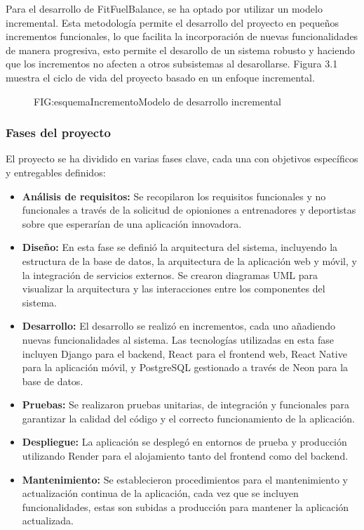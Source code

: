Para el desarrollo de FitFuelBalance, se ha optado por utilizar un modelo incremental. Esta metodología permite el desarrollo del proyecto en pequeños incrementos funcionales, lo que facilita la incorporación de nuevas funcionalidades de manera progresiva, esto permite el desarollo de un sistema robusto y haciendo que los incrementos no afecten a otros subsistemas al desarollarse. Figura 3.1 muestra el ciclo de vida del proyecto basado en un enfoque incremental.

\begin{figure}[Esquema Modelo Incremental]{FIG:esquemaIncremento}{Modelo de desarrollo incremental}
\end{figure}

\subsubsection{Fases del proyecto}

El proyecto se ha dividido en varias fases clave, cada una con objetivos específicos y entregables definidos:

\begin{itemize}
    \item \textbf{Análisis de requisitos:} Se recopilaron los requisitos funcionales y no funcionales a través de la solicitud de opioniones a entrenadores y deportistas sobre que esperarían de una aplicación innovadora.

    \item \textbf{Diseño:} En esta fase se definió la arquitectura del sistema, incluyendo la estructura de la base de datos, la arquitectura de la aplicación web y móvil, y la integración de servicios externos. Se crearon diagramas UML para visualizar la arquitectura y las interacciones entre los componentes del sistema.

    \item \textbf{Desarrollo:} El desarrollo se realizó en incrementos, cada uno añadiendo nuevas funcionalidades al sistema. Las tecnologías utilizadas en esta fase incluyen Django para el backend, React para el frontend web, React Native para la aplicación móvil, y PostgreSQL gestionado a través de Neon para la base de datos.

    \item \textbf{Pruebas:} Se realizaron pruebas unitarias, de integración y funcionales para garantizar la calidad del código y el correcto funcionamiento de la aplicación.

    \item \textbf{Despliegue:} La aplicación se desplegó en entornos de prueba y producción utilizando Render para el alojamiento tanto del frontend como del backend.

    \item \textbf{Mantenimiento:} Se establecieron procedimientos para el mantenimiento y actualización continua de la aplicación, cada vez que se incluyen funcionalidades, estas son subidas a producción para mantener la aplicación actualizada.

\end{itemize}

